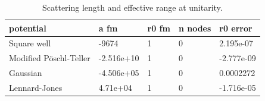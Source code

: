 \begin{table}[htbp]
\centering
\small
\caption{Scattering length and effective range at unitarity.}
\label{tab:measured}
\begin{tabular}{lllll}
\hline
potential & a fm & r0 fm & n nodes & r0 error \\
\hline
Square well & -9674 & 1 & 0 & 2.195e-07\\
Modified Pöschl-Teller & -2.516e+10 & 1 & 0 & -2.777e-09\\
Gaussian & -4.506e+05 & 1 & 0 & 0.0002272\\
Lennard-Jones & 4.71e+04 & 1 & 0 & -1.716e-05 \\
\hline
\end{tabular}
\end{table}
